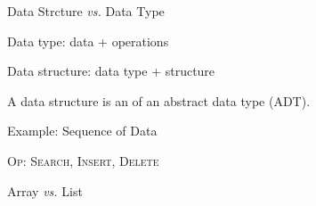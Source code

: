 \begin{frame}{}
  \centerline{\large Data Strcture \emph{vs.} Data Type}

  \pause
  \vspace{0.50cm}
  \centerline{Data type: data + operations}

  \pause
  \vspace{0.50cm}
  \centerline{Data structure: data type + structure}

  \pause
  \vspace{0.60cm}
  \centerline{A data structure is an  of an abstract data type (ADT).}

  \pause
  \vspace{0.80cm}
  \begin{exampleblock}{Example: Sequence of Data}
    \centerline{\textsc{Op: Search, Insert, Delete}}

    \vspace{0.20cm}
    \centerline{Array \emph{vs.} List}
  \end{exampleblock}
\end{frame}
